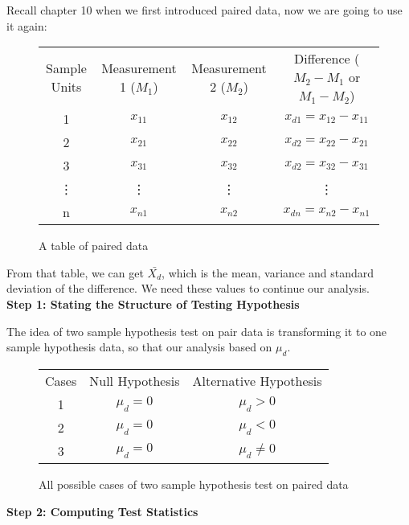 Recall chapter 10 when we first introduced paired data, now we are going to use it again:
\begin{center}
\begin{figure}[H]
\centering
\begin{tabular}{ c c c c }
 Sample Units & Measurement 1 ($M_1$) & Measurement 2 ($M_2$) & Difference ($M_2 - M_1$ or $M_1 - M_2$)\\ 
 1 & $x_{11}$ & $x_{12}$ & $x_{d1} = x_{12} -  x_{11}$\\  
 2 & $x_{21}$ & $x_{22}$ & $x_{d2} = x_{22} -  x_{21}$\\
 3 & $x_{31}$ & $x_{32}$ & $x_{d2} = x_{32} -  x_{31}$\\
 \vdots & \vdots & \vdots & \vdots\\
 n & $x_{n1}$ & $x_{n2}$ & $x_{dn} = x_{n2} -  x_{n1}$\\
\end{tabular}
\caption{A table of paired data}
\end{figure}
\end{center}
\vspace{-0.75cm}

From that table, we can get $\bar{X_d}$, which is the mean, variance and standard deviation of the difference. We need these values to continue our analysis.\\

\textbf{Step 1: Stating the Structure of Testing Hypothesis}

The idea of two sample hypothesis test on pair data is transforming it to one sample hypothesis data, so that our analysis based on $\mu_d$.

\begin{center}
\begin{figure}[H]
\centering
\begin{tabular}{ c c c }
Cases & Null Hypothesis & Alternative Hypothesis \\
     1	   & $\mu_d = 0$ & $\mu_d > 0$ \\
     2	   & $\mu_d = 0$ & $\mu_d < 0$ \\
     3    & $\mu_d = 0$ & $\mu_d \neq 0$ \\
\end{tabular}
\caption{All possible cases of two sample hypothesis test on paired data}
\end{figure}
\end{center}
\vspace{-0.75cm}

\textbf{Step 2: Computing Test Statistics}

